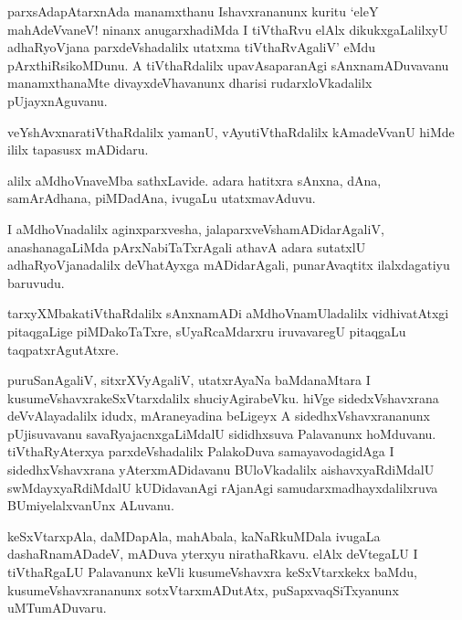 \documentclass{article}
\begin{document}
\begin{mn}
parxsAdapAtarxnAda manamxthanu Ishavxrananunx kuritu `eleY mahAdeVvaneV! ninanx anugarxhadiMda 
I tiVthaRvu elAlx dikukxgaLalilxyU adhaRyoVjana parxdeVshadalilx utatxma tiVthaRvAgaliV' eMdu 
pArxthiRsikoMDunu. A tiVthaRdalilx upavAsaparanAgi sAnxnamADuvavanu manamxthanaMte divayxdeVhavanunx
dharisi rudarxloVkadalilx pUjayxnAguvanu.
\end{mn}

\begin{mn}
veYshAvxnaratiVthaRdalilx yamanU, vAyutiVthaRdalilx kAmadeVvanU hiMde ililx tapasusx mADidaru.
\end{mn}

\begin{mn}
alilx aMdhoVnaveMba sathxLavide. adara hatitxra sAnxna, dAna, samArAdhana, piMDadAna, ivugaLu 
utatxmavAduvu. 
\end{mn}

\begin{mn}
I aMdhoVnadalilx aginxparxvesha, jalaparxveVshamADidarAgaliV, anashanagaLiMda 
pArxNabiTaTxrAgali athavA adara sutatxlU 
adhaRyoVjanadalilx deVhatAyxga mADidarAgali, punarAvaqtitx ilalxdagatiyu baruvudu.
\end{mn}

\begin{mn}
tarxyXMbakatiVthaRdalilx sAnxnamADi aMdhoVnamUladalilx vidhivatAtxgi pitaqgaLige piMDakoTaTxre, 
sUyaRcaMdarxru iruvavaregU pitaqgaLu taqpatxrAgutAtxre.
\end{mn}

\begin{mn}
puruSanAgaliV, sitxrXVyAgaliV, utatxrAyaNa baMdanaMtara I kusumeVshavxrakeSxVtarxdalilx 
shuciyAgirabeVku. hiVge sidedxVshavxrana deVvAlayadalilx  idudx, mAraneyadina beLigeyx A 
sidedhxVshavxrananunx pUjisuvavanu savaRyajacnxgaLiMdalU sididhxsuva Palavanunx hoMduvanu. 
tiVthaRyAterxya parxdeVshadalilx PalakoDuva samayavodagidAga I sidedhxVshavxrana yAterxmADidavanu 
BUloVkadalilx aishavxyaRdiMdalU swMdayxyaRdiMdalU kUDidavanAgi rAjanAgi samudarxmadhayxdalilxruva 
BUmiyelalxvanUnx ALuvanu.
\end{mn}

\begin{mn}
keSxVtarxpAla, daMDapAla, mahAbala, kaNaRkuMDala ivugaLa  dashaRnamADadeV, mADuva yterxyu 
nirathaRkavu. elAlx deVtegaLU I tiVthaRgaLU Palavanunx keVli kusumeVshavxra keSxVtarxkekx baMdu, 
kusumeVshavxrananunx sotxVtarxmADutAtx, puSapxvaqSiTxyanunx uMTumADuvaru.
\end{mn}
\end{document}
